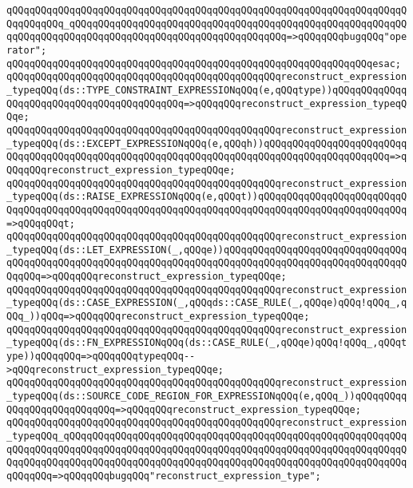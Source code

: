 \verb|qQQqqQQqqQQqqQQqqQQqqQQqqQQqqQQqqQQqqQQqqQQqqQQqqQQqqQQqqQQqqQQqqQQqqQQqqQQqqQQq_qQQqqQQqqQQqqQQqqQQqqQQqqQQqqQQqqQQqqQQqqQQqqQQqqQQqqQQqqQQqqQQqqQQqqQQqqQQqqQQqqQQqqQQqqQQqqQQqqQQqqQQqqQQq=>qQQqqQQqbugqQQq"operator";|\newline
\verb|qQQqqQQqqQQqqQQqqQQqqQQqqQQqqQQqqQQqqQQqqQQqqQQqqQQqqQQqqQQqqQQqesac;|\newline
\newline
\verb|qQQqqQQqqQQqqQQqqQQqqQQqqQQqqQQqqQQqqQQqqQQqqQQqreconstruct_expression_typeqQQq(ds::TYPE_CONSTRAINT_EXPRESSIONqQQq(e,qQQqtype))qQQqqQQqqQQqqQQqqQQqqQQqqQQqqQQqqQQqqQQqqQQq=>qQQqqQQqreconstruct_expression_typeqQQqe;|\newline
\verb|qQQqqQQqqQQqqQQqqQQqqQQqqQQqqQQqqQQqqQQqqQQqqQQqreconstruct_expression_typeqQQq(ds::EXCEPT_EXPRESSIONqQQq(e,qQQqh))qQQqqQQqqQQqqQQqqQQqqQQqqQQqqQQqqQQqqQQqqQQqqQQqqQQqqQQqqQQqqQQqqQQqqQQqqQQqqQQqqQQqqQQqqQQq=>qQQqqQQqreconstruct_expression_typeqQQqe;|\newline
\verb|qQQqqQQqqQQqqQQqqQQqqQQqqQQqqQQqqQQqqQQqqQQqqQQqreconstruct_expression_typeqQQq(ds::RAISE_EXPRESSIONqQQq(e,qQQqt))qQQqqQQqqQQqqQQqqQQqqQQqqQQqqQQqqQQqqQQqqQQqqQQqqQQqqQQqqQQqqQQqqQQqqQQqqQQqqQQqqQQqqQQqqQQqqQQq=>qQQqqQQqt;|\newline
\verb|qQQqqQQqqQQqqQQqqQQqqQQqqQQqqQQqqQQqqQQqqQQqqQQqreconstruct_expression_typeqQQq(ds::LET_EXPRESSION(_,qQQqe))qQQqqQQqqQQqqQQqqQQqqQQqqQQqqQQqqQQqqQQqqQQqqQQqqQQqqQQqqQQqqQQqqQQqqQQqqQQqqQQqqQQqqQQqqQQqqQQqqQQqqQQqqQQq=>qQQqqQQqreconstruct_expression_typeqQQqe;|\newline
\verb|qQQqqQQqqQQqqQQqqQQqqQQqqQQqqQQqqQQqqQQqqQQqqQQqreconstruct_expression_typeqQQq(ds::CASE_EXPRESSION(_,qQQqds::CASE_RULE(_,qQQqe)qQQq!qQQq_,qQQq_))qQQq=>qQQqqQQqreconstruct_expression_typeqQQqe;|\newline
\verb|qQQqqQQqqQQqqQQqqQQqqQQqqQQqqQQqqQQqqQQqqQQqqQQqreconstruct_expression_typeqQQq(ds::FN_EXPRESSIONqQQq(ds::CASE_RULE(_,qQQqe)qQQq!qQQq_,qQQqtype))qQQqqQQq=>qQQqqQQqtypeqQQq-->qQQqreconstruct_expression_typeqQQqe;|\newline
\verb|qQQqqQQqqQQqqQQqqQQqqQQqqQQqqQQqqQQqqQQqqQQqqQQqreconstruct_expression_typeqQQq(ds::SOURCE_CODE_REGION_FOR_EXPRESSIONqQQq(e,qQQq_))qQQqqQQqqQQqqQQqqQQqqQQqqQQq=>qQQqqQQqreconstruct_expression_typeqQQqe;|\newline
\verb|qQQqqQQqqQQqqQQqqQQqqQQqqQQqqQQqqQQqqQQqqQQqqQQqreconstruct_expression_typeqQQq_qQQqqQQqqQQqqQQqqQQqqQQqqQQqqQQqqQQqqQQqqQQqqQQqqQQqqQQqqQQqqQQqqQQqqQQqqQQqqQQqqQQqqQQqqQQqqQQqqQQqqQQqqQQqqQQqqQQqqQQqqQQqqQQqqQQqqQQqqQQqqQQqqQQqqQQqqQQqqQQqqQQqqQQqqQQqqQQqqQQqqQQqqQQqqQQqqQQqqQQqqQQqqQQq=>qQQqqQQqbugqQQq"reconstruct_expression_type";|\newline
